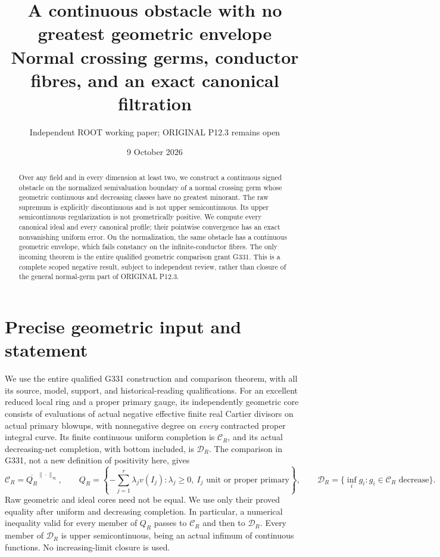 \documentclass[11pt]{article}
\title{A continuous obstacle with no greatest geometric envelope\\
Normal crossing germs, conductor fibres, and an exact canonical filtration}
\author{Independent ROOT working paper; ORIGINAL P12.3 remains open}
\date{9 October 2026}
\newcommand{\C}{\mathcal C}
\newcommand{\D}{\mathcal D}
\begin{document}
\maketitle

\begin{abstract}
Over any field and in every dimension at least two, we construct a continuous
signed obstacle on the normalized semivaluation boundary of a normal crossing
germ whose geometric continuous and decreasing classes have no greatest
minorant. The raw supremum is explicitly discontinuous and is not upper
semicontinuous. Its upper semicontinuous regularization is not geometrically
positive. We compute every canonical ideal and every canonical profile; their
pointwise convergence has an exact nonvanishing uniform error. On the
normalization, the same obstacle has a continuous geometric envelope, which
fails constancy on the infinite-conductor fibres. The only incoming theorem
is the entire qualified geometric comparison grant G331. This is a complete
scoped negative result, subject to independent review, rather than closure
of the general normal-germ part of ORIGINAL P12.3.
\end{abstract}

\section{Precise geometric input and statement}

We use the entire qualified G331 construction and comparison theorem, with
all its source, model, support, and historical-reading qualifications.
For an excellent reduced local ring and a proper primary gauge, its
independently geometric core consists of evaluations of actual negative
effective finite real Cartier divisors on actual primary blowups, with
nonnegative degree on \emph{every} contracted proper integral curve.
Its finite continuous uniform completion is \(\C_R\), and its actual
decreasing-net completion, with bottom included, is \(\D_R\).
The comparison in G331, not a new definition of positivity here, gives
\[
 \C_R=\overline{Q_R}^{\|\cdot\|_\infty},\qquad
 Q_R=\left\{-\sum_{j=1}^{r}\lambda_jv(I_j):
              \lambda_j\geq0,\ I_j\text{ unit or proper primary}\right\},
 \qquad \D_R=\{\inf_i g_i:g_i\in\C_R\text{ decrease}\}.
\]
Raw geometric and ideal cores need not be equal. We use only their proved
equality after uniform and decreasing completion. In particular, a numerical
inequality valid for every member of \(Q_R\) passes to \(\C_R\) and then
to \(\D_R\). Every member of \(\D_R\) is upper semicontinuous, being an
actual infimum of continuous functions. No increasing-limit closure is used.
\end{document}
